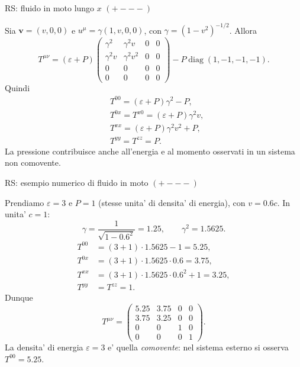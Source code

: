 \begin{frame}[t]{RS: fluido in moto lungo $x$ $(+---)$}\small\raggedright

Sia $\mathbf v=(v,0,0)$ e $u^\mu=\gamma(1,v,0,0)$, con $\gamma=(1-v^2)^{-1/2}$. Allora
\[
T^{\mu\nu}=(\varepsilon+P)
\begin{pmatrix}
\gamma^2&\gamma^2v&0&0\\
\gamma^2v&\gamma^2v^2&0&0\\
0&0&0&0\\
0&0&0&0
\end{pmatrix}
-P\operatorname{diag}(1,-1,-1,-1).
\]
Quindi
\[
\begin{aligned}
&T^{00}=(\varepsilon+P)\gamma^2-P,\\
&T^{0x}=T^{x0}=(\varepsilon+P)\gamma^2v,\\
&T^{xx}=(\varepsilon+P)\gamma^2v^2+P,\\
&T^{yy}=T^{zz}=P.
\end{aligned}
\]
La pressione contribuisce anche all'energia e al momento osservati in un sistema non comovente.

\end{frame}

\begin{frame}[t]{RS: esempio numerico di fluido in moto $(+---)$}\small\raggedright

Prendiamo $\varepsilon=3$ e $P=1$ (stesse unita' di densita' di energia), con $v=0.6c$.
In unita' $c=1$:
\[
\gamma=\frac1{\sqrt{1-0.6^2}}=1.25,\qquad \gamma^2=1.5625.
\]
\[
\begin{aligned}
T^{00}&=(3+1)\cdot1.5625-1=5.25,\\
T^{0x}&=(3+1)\cdot1.5625\cdot0.6=3.75,\\
T^{xx}&=(3+1)\cdot1.5625\cdot0.6^2+1=3.25,\\
T^{yy}&=T^{zz}=1.
\end{aligned}
\]
Dunque
\[
T^{\mu\nu}=
\begin{pmatrix}5.25&3.75&0&0\\3.75&3.25&0&0\\0&0&1&0\\0&0&0&1\end{pmatrix}.
\]
La densita' di energia $\varepsilon=3$ e' quella \emph{comovente}: nel sistema esterno si osserva $T^{00}=5.25$.

\end{frame}

